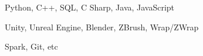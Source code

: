 \documentclass[11pt]{spidercv}
\begin{document}
    \begin{SideBar}{\ColorBackground}{\ColorTextSide}
        
        
        
        \vspace*{1cm}

        \begin{ItemList}{\ColorHighlight}
            \item [\faCode] Python, C++, SQL, C Sharp, Java, JavaScript
            \item [\faCubes]  Unity, Unreal Engine, Blender, ZBrush, Wrap/ZWrap
            \item [\faGear]  Spark, Git, etc
        \end{ItemList}

        \vspace*{1cm}


        \begin{SkillGauges}{\ColorHighlight}
        \end{SkillGauges}
    \end{SideBar}

    

\end{document}
